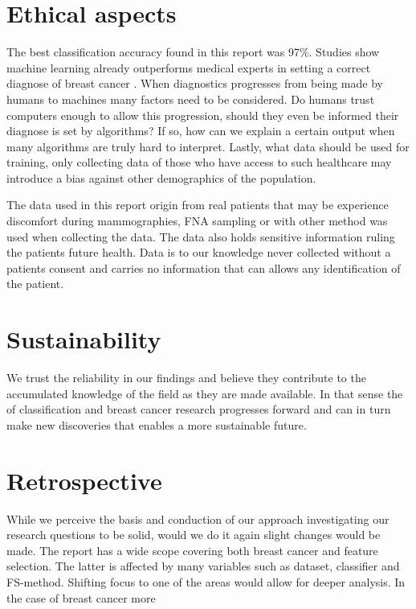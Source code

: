 \section{Ethical aspects}

The best classification accuracy found in this report was 97\%. Studies show machine learning already outperforms medical experts in setting a correct diagnose of breast cancer \parencite{fnab}. When diagnostics progresses from being made by humans to machines many factors need to be considered. Do humans trust computers enough to allow this progression, should they even be informed their diagnose is set by algorithms? If so, how can we explain a certain output when many algorithms are truly hard to interpret. Lastly, what data should be used for training, only collecting data of those who have access to such healthcare may introduce a bias against other demographics of the population.

The data used in this report origin from real patients that may be experience discomfort during mammographies, FNA sampling or with other method was used when collecting the data. The data also holds sensitive information ruling the patients future health. Data is to our knowledge never collected without a patients consent and carries no information that can allows any identification of the patient.

\section{Sustainability}

We trust the reliability in our findings and believe they contribute to the accumulated knowledge of the field as they are made available. In that sense the of classification and breast cancer research progresses forward and can in turn make new discoveries that enables a more sustainable future.

\section{Retrospective}

While we perceive the basis and conduction of our approach investigating our research questions to be solid, would we do it again slight changes would be made. The report has a wide scope covering both breast cancer and feature selection. The latter is affected by many variables such as dataset, classifier and FS-method. Shifting focus to one of the areas would allow for deeper analysis. In the case of breast cancer more 
